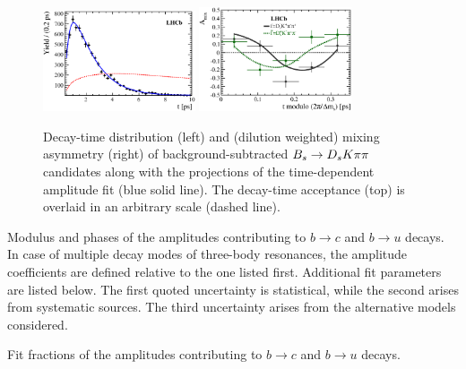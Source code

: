 \begin{figure}[h]
	\centering		
		\includegraphics[width=0.4\textwidth, height = !]{figs/fullFit/signal_new/h_t.eps} 
		\includegraphics[width=0.4\textwidth, height = !]{figs/fullFit/signal_new/h_asym.eps} 		
		\caption{Decay-time distribution (left) and (dilution weighted) mixing asymmetry (right)
		 of background-subtracted $B_s\rightarrow{\ensuremath{{D}_{s}}}{\ensuremath{K}}{\ensuremath{\pi}}{\ensuremath{\pi}}$  candidates along with the projections of the time-dependent amplitude fit (blue solid line).
		 		 The decay-time acceptance (top) is overlaid in an arbitrary scale (dashed line).
		 } 		
		\label{fig:fullFit2}		
\end{figure}

\begin{table}[h]
\centering
\caption{
\small
Modulus and phases of the amplitudes contributing to $b \to c$ and $b \to u$ decays.
In case of multiple decay modes of three-body resonances, the amplitude coefficients are defined relative to the one listed first.
Additional fit parameters are listed below.
The first quoted uncertainty is statistical, while the second arises from systematic sources. 
The third uncertainty arises from the alternative models considered.
}
\resizebox{\linewidth}{!}{
	\renewcommand{\arraystretch}{1.5}
	
}
\label{tab:fullResult}
\end{table}

\begin{table}[h]
\centering
\caption{
Fit fractions of the amplitudes contributing to $b \to c$ and $b \to u$ decays.
}
	\renewcommand{\arraystretch}{1.5}
	
\label{tab:fullFractions}
\end{table}


